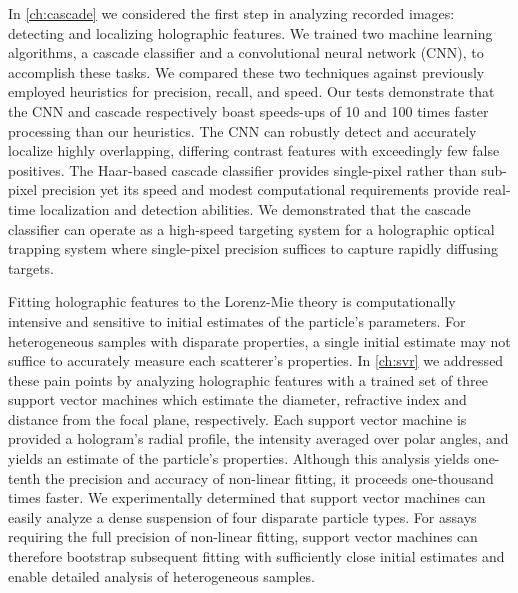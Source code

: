 In \autoref{ch:cascade} we considered the first step in analyzing recorded
images: detecting and localizing holographic features. We trained two machine
learning algorithms, a cascade classifier and a convolutional neural network (CNN),
to accomplish these tasks. We compared these two techniques against previously
employed heuristics for precision, recall, and speed. Our tests demonstrate that
the CNN and cascade respectively boast speeds-ups of \num{10} and \num{100} times
faster processing than our heuristics. The CNN can robustly detect and accurately
localize highly overlapping, differing contrast features with exceedingly few false positives.
The Haar-based cascade classifier provides single-pixel rather than
sub-pixel precision yet its speed and modest computational requirements provide
real-time localization and detection abilities. We demonstrated that the cascade
classifier can operate as a high-speed targeting system for a holographic
optical trapping system where single-pixel precision suffices to capture
rapidly diffusing targets.

Fitting holographic features to the Lorenz-Mie theory is computationally intensive
and sensitive to initial estimates of the particle's parameters. For heterogeneous
samples with disparate properties, a single initial estimate may not suffice
to accurately measure each scatterer's properties. In \autoref{ch:svr} we
addressed these pain points by analyzing holographic features with a trained set
of three support vector machines which estimate the diameter, refractive index
and distance from the focal plane, respectively. Each support vector
machine is provided a hologram's radial profile, the intensity averaged over
polar angles, and yields an estimate of the particle's properties. Although
this analysis yields one-tenth the precision and accuracy of non-linear fitting,
it proceeds one-thousand times faster. We experimentally determined that
support vector machines can easily analyze a dense suspension of four
disparate particle types. For assays requiring the full precision of non-linear
fitting, support vector machines can therefore bootstrap subsequent fitting with sufficiently
close initial estimates and enable detailed analysis of heterogeneous samples.

